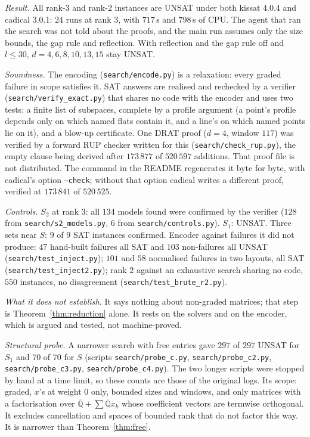 \documentclass[11pt,a4paper]{article}
\theoremstyle{plain}
\theoremstyle{definition}
\newcommand{\Qbar}{\overline{\mathbb{Q}}}
\newcommand{\scr}[1]{\nolinkurl{#1}}
\begin{document}
\emph{Result.} All rank-$3$ and rank-$2$ instances are UNSAT under both kissat 4.0.4 and cadical 3.0.1: $24$ runs at rank $3$, with $717$\,s and $798$\,s of CPU. The agent that ran the search was not told about the proofs, and the main run assumes only the size bounds, the gap rule and reflection. With reflection and the gap rule off and $l\le30$, $d=4,6,8,10,13,15$ stay UNSAT.

\emph{Soundness.} The encoding (\scr{search/encode.py}) is a relaxation: every graded failure in scope satisfies it. SAT answers are realised and rechecked by a verifier (\scr{search/verify_exact.py}) that shares no code with the encoder and uses two tests: a finite list of subspaces, complete by a profile argument (a point's profile depends only on which named flats contain it, and a line's on which named points lie on it), and a blow-up certificate. One DRAT proof ($d=4$, window $117$) was verified by a forward RUP checker written for this (\scr{search/check_rup.py}), the empty clause being derived after $173\,877$ of $520\,597$ additions. That proof file is not distributed. The command in the README regenerates it byte for byte, with cadical's option \texttt{--check}; without that option cadical writes a different proof, verified at $173\,841$ of $520\,525$.

\emph{Controls.} $S_{2}$ at rank $3$: all $134$ models found were confirmed by the verifier ($128$ from \scr{search/s2_models.py}, $6$ from \scr{search/controls.py}). $S_{1}$: UNSAT. Three sets near $S$: $9$ of $9$ SAT instances confirmed. Encoder against failures it did not produce: $47$ hand-built failures all SAT and $103$ non-failures all UNSAT (\scr{search/test_inject.py}); $101$ and $58$ normalised failures in two layouts, all SAT (\scr{search/test_inject2.py}); rank $2$ against an exhaustive search sharing no code, $550$ instances, no disagreement (\scr{search/test_brute_r2.py}).

\emph{What it does not establish.} It says nothing about non-graded matrices; that step is Theorem~\ref{thm:reduction} alone. It rests on the solvers and on the encoder, which is argued and tested, not machine-proved.

\emph{Structural probe.} A narrower search with free entries gave $297$ of $297$ UNSAT for $S_{1}$ and $70$ of $70$ for $S$ (scripts \scr{search/probe_c.py}, \scr{search/probe_c2.py}, \scr{search/probe_c3.py}, \scr{search/probe_c4.py}). The two longer scripts were stopped by hand at a time limit, so these counts are those of the original logs. Its scope: graded, $x$'s at weight $0$ only, bounded sizes and windows, and only matrices with a factorisation over $\Qbar+\sum\Qbar x_{k}$ whose coefficient vectors are termwise orthogonal. It excludes cancellation and spaces of bounded rank that do not factor this way. It is narrower than Theorem~\ref{thm:free}.
\end{document}

